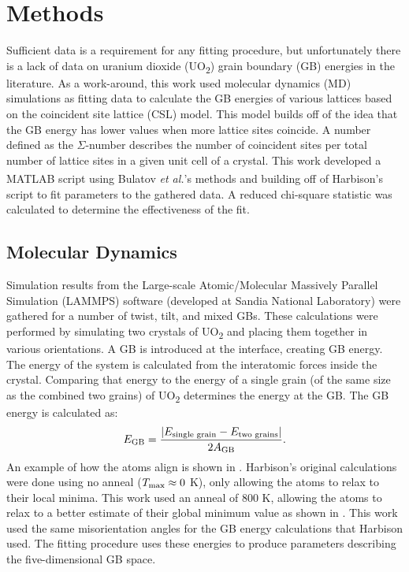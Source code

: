 \documentclass[twoside,senior]{BYUPhys}
\begin{document}
\chapter{Methods\label{methods}}
Sufficient data is a requirement for any fitting procedure, but unfortunately there is a lack of data on uranium dioxide (UO\textsubscript{2}) grain boundary (GB) energies in the literature.  As a work-around, this work used molecular dynamics (MD) simulations\cite{zhang2016,hansen2016} as fitting data to calculate the GB energies of various lattices based on the coincident site lattice (CSL) model. This model builds off of the idea that the GB energy has lower values when more lattice sites coincide.  A number defined as the $\Sigma$-number describes the number of coincident sites per total number of lattice sites in a given unit cell of a crystal.\cite{lejcek2010, rohrer2011} This work developed a MATLAB\textsuperscript{\textregistered} script using Bulatov \emph{et al.}'s methods\cite{bulatov2014} and building off of Harbison's script\cite{harbison2015} to fit parameters to the gathered data.  A reduced chi-square statistic was calculated to determine the effectiveness of the fit.

\section{Molecular Dynamics\label{methods:MD}}
Simulation results from the Large-scale Atomic/Molecular Massively Parallel Simulation (LAMMPS) software (developed at Sandia National Laboratory\cite{plimpton1995}) were gathered for a number of twist, tilt, and mixed GBs.  These calculations were performed by simulating two crystals of UO\textsubscript{2} and placing them together in various orientations.  A GB is introduced at the interface, creating GB energy.  The energy of the system is calculated from the interatomic forces inside the crystal.  Comparing that energy to the energy of a single grain (of the same size as the combined two grains) of UO\textsubscript{2} determines the energy at the GB.\cite{harbison2015}  The GB energy is calculated as:\cite{butterfield2013}
\begin{equation}\label{eq:GBE}
E_{\textnormal{GB}}=\frac{|E_{\textnormal{single grain}} - E_{\textnormal{two grains}}|}{2A_{\textnormal{GB}}}.
\end{equation} 
An example of how the atoms align is shown in . Harbison's original calculations\cite{harbison2015} were done using no anneal ($T_{\textnormal{max}}\approx0$ K), only allowing the atoms to relax to their local minima.  This work used an anneal of 800 K, allowing the atoms to relax to a better estimate of their global minimum value as shown in .  This work used the same misorientation angles for the GB energy calculations that Harbison used.  The fitting procedure uses these energies to produce parameters describing the five-dimensional GB space.
\end{document}
